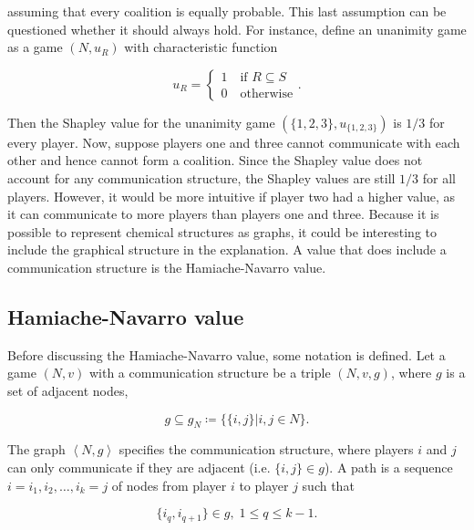assuming that every coalition is equally probable. This last assumption can be questioned whether it should
always hold. For instance, define an unanimity game as a game $(N, u_R)$ with characteristic function


\begin{equation}
	u_R = \begin{cases}
		1 \quad \text{if } R \subseteq S \\
		0 \quad \text{otherwise}
	\end{cases}.
\end{equation}


Then the Shapley value for the unanimity game $(\{1, 2, 3\}, u_{\{1,2,3\}})$ is $1/3$ for every player.\cite{hamiache_value_1999}
Now, suppose players one and three cannot communicate with each other and hence cannot form a coalition.
Since the Shapley value does not account for any communication structure, the Shapley values are still
$1/3$ for all players. However, it would be more intuitive if player two had a higher value, as it can
communicate to more players than players one and three. Because it is possible to represent chemical
structures as graphs, it could be interesting to include the graphical structure in the explanation. A
value that does include a communication structure is the Hamiache-Navarro value.\cite{hamiache_value_1999, hamiache_associated_2020}


\subsection{Hamiache-Navarro value}


Before discussing the Hamiache-Navarro value, some notation is defined. Let a game $(N, v)$ with a
communication structure be a triple $(N, v, g)$, where $g$ is a set of adjacent nodes\cite{hamiache_value_1999},


\begin{equation}
	g \subseteq g_N \coloneqq \{ \{i, j \} | i, j \in N \}.
\end{equation}

The graph $\left< N, g \right>$ specifies the communication structure, where players
$i$ and $j$ can only communicate if they are adjacent (i.e. $\{i, j \} \in g$).
A path is a sequence $i = i_1, i_2, \dots , i_k = j$ of nodes from player
$i$ to player $j$ such that


\begin{equation}
	\{i_q, i_{q+1} \} \in g, \; 1 \le q \le k - 1.
\end{equation}


